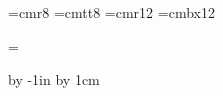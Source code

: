 

\hsize=297mm
\vsize=210mm


 
\nopagenumbers


\parindent=0pt

\def\epsfsize#1#2{#1}

\font\small=cmr8
\font\smalltt=cmtt8
\font\large=cmr12
\font\largebx=cmbx12


\headline={\hfil}

\advance\hoffset by -1in
\advance\hoffset by 1cm


\iftrue 


